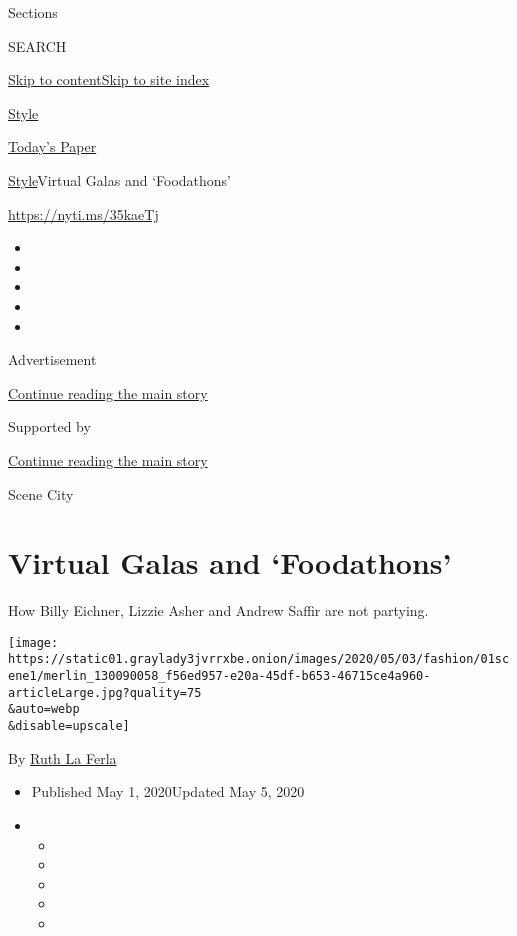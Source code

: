 Sections

SEARCH

\protect\hyperlink{site-content}{Skip to
content}\protect\hyperlink{site-index}{Skip to site index}

\href{https://www.nytimes3xbfgragh.onion/section/style}{Style}

\href{https://myaccount.nytimes3xbfgragh.onion/auth/login?response_type=cookie\&client_id=vi}{}

\href{https://www.nytimes3xbfgragh.onion/section/todayspaper}{Today's
Paper}

\href{/section/style}{Style}\textbar{}Virtual Galas and `Foodathons'

\url{https://nyti.ms/35kaeTj}

\begin{itemize}
\item
\item
\item
\item
\item
\end{itemize}

Advertisement

\protect\hyperlink{after-top}{Continue reading the main story}

Supported by

\protect\hyperlink{after-sponsor}{Continue reading the main story}

Scene City

\hypertarget{virtual-galas-and-foodathons}{%
\section{Virtual Galas and
`Foodathons'}\label{virtual-galas-and-foodathons}}

How Billy Eichner, Lizzie Asher and Andrew Saffir are not partying.

\texttt{[image: https://static01.graylady3jvrrxbe.onion/images/2020/05/03/fashion/01scene1/merlin\_130090058\_f56ed957-e20a-45df-b653-46715ce4a960-articleLarge.jpg?quality=75\\\&auto=webp\\\&disable=upscale]}

By \href{https://www.nytimes3xbfgragh.onion/by/ruth-la-ferla}{Ruth La
Ferla}

\begin{itemize}
\item
  Published May 1, 2020Updated May 5, 2020
\item
  \begin{itemize}
  \item
  \item
  \item
  \item
  \item
  \end{itemize}
\end{itemize}

